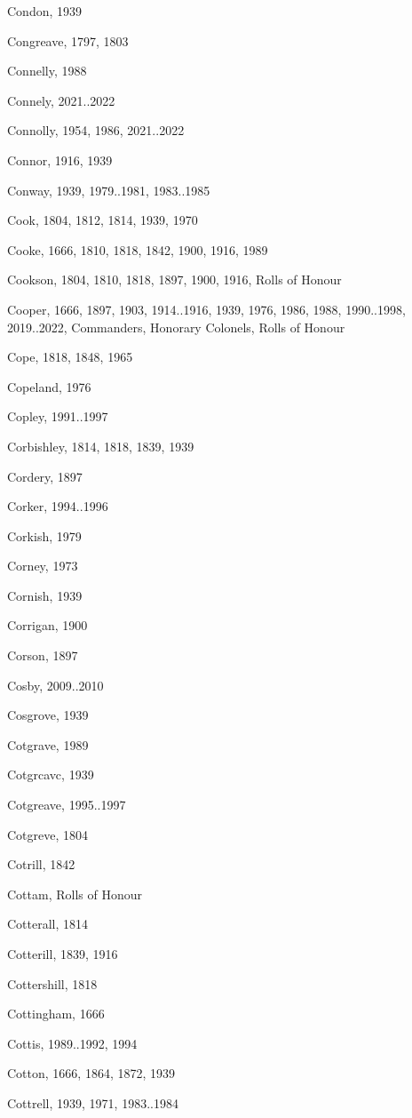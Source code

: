 \begin{theindex}
\item Condon, 1939
\item Congreave, 1797, 1803
\item Connelly, 1988
\item Connely, 2021..2022
\item Connolly, 1954, 1986, 2021..2022
\item Connor, 1916, 1939
\item Conway, 1939, 1979..1981, 1983..1985
\item Cook, 1804, 1812, 1814, 1939, 1970
\item Cooke, 1666, 1810, 1818, 1842, 1900, 1916, 1989
\item Cookson, 1804, 1810, 1818, 1897, 1900, 1916, Rolls of Honour
\item Cooper, 1666, 1897, 1903, 1914..1916, 1939, 1976, 1986, 1988, 1990..1998, 2019..2022, Commanders, Honorary Colonels, Rolls of Honour
\item Cope, 1818, 1848, 1965
\item Copeland, 1976
\item Copley, 1991..1997
\item Corbishley, 1814, 1818, 1839, 1939
\item Cordery, 1897
\item Corker, 1994..1996
\item Corkish, 1979
\item Corney, 1973
\item Cornish, 1939
\item Corrigan, 1900
\item Corson, 1897
\item Cosby, 2009..2010
\item Cosgrove, 1939
\item Cotgrave, 1989
\item Cotgrcavc, 1939
\item Cotgreave, 1995..1997
\item Cotgreve, 1804
\item Cotrill, 1842
\item Cottam, Rolls of Honour
\item Cotterall, 1814
\item Cotterill, 1839, 1916
\item Cottershill, 1818
\item Cottingham, 1666
\item Cottis, 1989..1992, 1994
\item Cotton, 1666, 1864, 1872, 1939
\item Cottrell, 1939, 1971, 1983..1984

\end{theindex}
